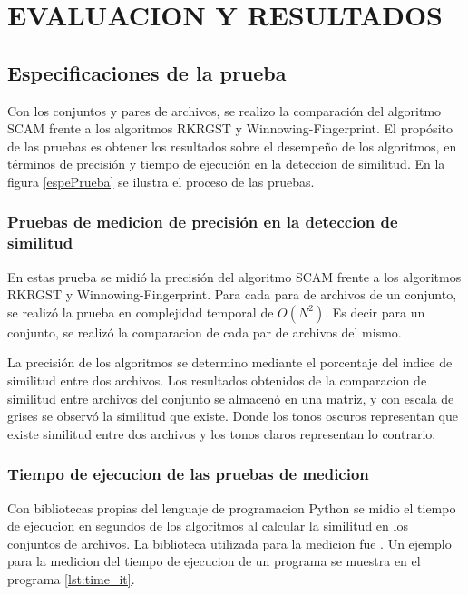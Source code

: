 \chapter{EVALUACION Y RESULTADOS}
\section{Especificaciones de la prueba}
Con los conjuntos y pares de archivos, se realizo la comparación del algoritmo SCAM frente a los algoritmos RKRGST y Winnowing-Fingerprint. El propósito de las pruebas es obtener los resultados sobre el desempeño de los algoritmos, en términos de precisión y tiempo de ejecución en la deteccion de similitud. En la figura \ref{espePrueba} se ilustra el proceso de las pruebas.



\subsection{Pruebas de medicion de precisión en la deteccion de similitud}
En estas prueba se midió la precisión del algoritmo SCAM frente a los algoritmos RKRGST y Winnowing-Fingerprint. Para cada para de archivos de un conjunto, se realizó la prueba en complejidad temporal de $O(N^2)$. Es decir para un conjunto, se realizó la comparacion de cada par de archivos del mismo.

La precisión de los algoritmos se determino mediante el porcentaje del indice de similitud entre dos archivos. Los resultados obtenidos de la comparacion de similitud entre archivos del conjunto se almacenó en una matriz, y con escala de grises se observó la similitud que existe. Donde los tonos oscuros representan que existe similitud entre dos archivos y los tonos claros representan lo contrario.

\subsection{Tiempo de ejecucion de las pruebas de medicion}
Con bibliotecas propias del lenguaje de programacion Python se midio el tiempo de ejecucion en segundos de los algoritmos al calcular la similitud en los conjuntos de archivos. La biblioteca utilizada para la medicion fue . Un ejemplo para la medicion del tiempo de ejecucion de un programa se muestra en el programa \ref{lst:time_it}.



